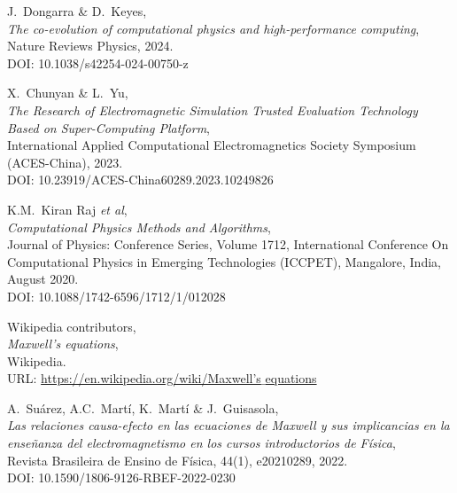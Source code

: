 \documentclass[11pt,a4paper,twoside,pdf]{article}
\numberwithin{equation}{section}
\begin{document}
\begin{thebibliography}{100}

  J.~Dongarra \& D.~Keyes, \\
  {\em The co-evolution of computational physics and high-performance computing},\\  
  Nature Reviews Physics, 2024. \\
  DOI: 10.1038/s42254-024-00750-z

 X.~Chunyan \& L.~Yu, \\
  {\em The Research of Electromagnetic Simulation Trusted Evaluation Technology Based on Super-Computing Platform},\\  
  International Applied Computational Electromagnetics Society Symposium (ACES-China), 2023. \\
  DOI: 10.23919/ACES-China60289.2023.10249826

 K.M.~Kiran Raj \textit{et al}, \\
  {\em Computational Physics Methods and Algorithms},\\ 
Journal of Physics: Conference Series, Volume 1712, International Conference On Computational Physics in Emerging Technologies (ICCPET), Mangalore, India, August 2020. \\
  DOI: 10.1088/1742-6596/1712/1/012028

  Wikipedia contributors, \\
  {\em Maxwell's equations},\\  
Wikipedia.\\
 URL: \href{https://en.wikipedia.org/wiki/Maxwell%27s_equations}{https://en.wikipedia.org/wiki/Maxwell's$\_$equations}

  

  A.~Suárez, A.C.~Martí, K.~Martí \& J.~Guisasola, \\
  {\em Las relaciones causa-efecto en las ecuaciones de Maxwell y sus implicancias en la enseñanza del electromagnetismo en los cursos introductorios de Física},\\  
  Revista Brasileira de Ensino de Física, 44(1), e20210289, 2022.\\
  DOI: 10.1590/1806-9126-RBEF-2022-0230


\end{thebibliography}
\end{document}
